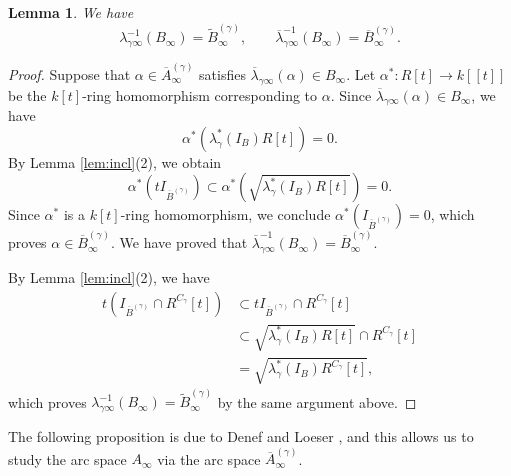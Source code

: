 \documentclass[a4paper,11pt]{amsart}
\newtheorem{lem}[thm]{Lemma}
\theoremstyle{definition}
\theoremstyle{remark}
\begin{document}
\begin{lem}\label{lem:pull back}
We have
\[
\lambda _{\gamma \infty} ^{-1} (B_{\infty}) = \widetilde{B}_{\infty} ^{(\gamma)}, \qquad 
\overline{\lambda} _{\gamma \infty} ^{-1} (B_{\infty}) = \overline{B}_{\infty} ^{(\gamma)}. 
\] 
\end{lem}
\begin{proof}
Suppose that $\alpha \in \overline{A}^{(\gamma)}_{\infty}$ satisfies $\overline{\lambda} _{\gamma \infty}(\alpha)\in B_{\infty}$. 
Let $\alpha ^*: R[t] \to k[[t]]$ be the $k[t]$-ring homomorphism corresponding to $\alpha$. 
Since $\overline{\lambda} _{\gamma \infty}(\alpha)\in B_{\infty}$, we have 
\[
\alpha ^* \left( \lambda^* _{\gamma}(I_B) R[t] \right) =0.
\]
By Lemma \ref{lem:incl}(2), we obtain
\[
\alpha ^* \left( tI_{\overline{B} ^{(\gamma)}} \right)
\subset \alpha ^* \left( \sqrt{\lambda^* _{\gamma}(I_B) R[t]} \right)=0.
\]
Since $\alpha ^*$ is a $k[t]$-ring homomorphism, 
we conclude $\alpha ^* \left( I_{\overline{B} ^{(\gamma)}} \right)=0$, which proves 
$\alpha \in \overline{B}_{\infty} ^{(\gamma)}$.
We have proved that $\overline{\lambda} _{\gamma \infty} ^{-1} (B_{\infty}) = \overline{B}_{\infty} ^{(\gamma)}$. 


By Lemma \ref{lem:incl}(2), we have 
\begin{align*}
t \left( I_{\overline{B} ^{(\gamma)}} \cap R^{C_{\gamma}}[t] \right)
&\subset t I_{\overline{B}^{(\gamma)}} \cap R^{C_{\gamma}}[t] \\
&\subset \sqrt{ \lambda ^* _{\gamma}(I_B) R[t]} \cap R^{C_{\gamma}}[t]\\
&=\sqrt{\lambda ^* _{\gamma}(I_B) R^{C_{\gamma}}[t]}, 
\end{align*}
which proves $\lambda _{\gamma \infty} ^{-1} (B_{\infty}) = \widetilde{B}_{\infty} ^{(\gamma)}$ by the same argument above. 
\end{proof}

The following proposition is due to Denef and Loeser \cite{DL02}, 
and this allows us to study the arc space $A_{\infty}$ via the arc space $\overline{A}^{(\gamma)}_{\infty}$. 
\end{document}
